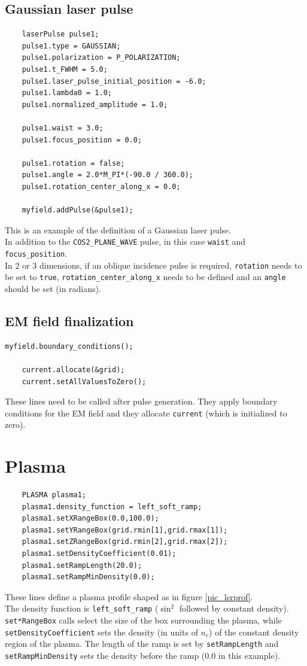 \documentclass[11pt,a4paper]{report}
\begin{document}
\subsection{Gaussian laser pulse}
\begin{lstlisting}
	laserPulse pulse1;
	pulse1.type = GAUSSIAN;
	pulse1.polarization = P_POLARIZATION;
	pulse1.t_FWHM = 5.0;
	pulse1.laser_pulse_initial_position = -6.0;
	pulse1.lambda0 = 1.0;
	pulse1.normalized_amplitude = 1.0;
    
	pulse1.waist = 3.0;
	pulse1.focus_position = 0.0;
    
	pulse1.rotation = false;
	pulse1.angle = 2.0*M_PI*(-90.0 / 360.0);
	pulse1.rotation_center_along_x = 0.0;

	myfield.addPulse(&pulse1);
\end{lstlisting}
This is an example of the definition of a Gaussian laser pulse.\\
In addition to the \verb+COS2_PLANE_WAVE+ pulse, in this case \verb+waist+ and \verb+focus_position+.\\
In 2 or 3 dimensions, if an oblique incidence pulse is required, \verb+rotation+ needs to be set to \verb+true+,   \verb+rotation_center_along_x+ needs to be defined and an \verb+angle+ should be set (in radians).
\subsection{EM field finalization}
\begin{lstlisting}[backgroundcolor=\color{no_modify}]
	myfield.boundary_conditions();

	current.allocate(&grid);
	current.setAllValuesToZero();
\end{lstlisting}
These lines need to be called after pulse generation. They apply boundary conditions for the EM field and they allocate \verb+current+ (which is initialized to zero).
\section{Plasma}
\begin{lstlisting}
	PLASMA plasma1;
	plasma1.density_function = left_soft_ramp;      
	plasma1.setXRangeBox(0.0,100.0);    
	plasma1.setYRangeBox(grid.rmin[1],grid.rmax[1]);                 
	plasma1.setZRangeBox(grid.rmin[2],grid.rmax[2]);
	plasma1.setDensityCoefficient(0.01);
	plasma1.setRampLength(20.0);
	plasma1.setRampMinDensity(0.0);             
\end{lstlisting}
These lines define a plasma profile shaped as in figure \ref{pic_lsrprof}.\\
The density function is \verb+left_soft_ramp+ ($\sin^2$ followed by constant density). \verb+set*RangeBox+ calls select the size of the box surrounding the plasma, while \verb+setDensityCoefficient+ sets the density (in units of $n_c$) of the constant density region of the plasma. The length of the ramp is set by \verb+setRampLength+ and \verb+setRampMinDensity+ sets the density before the ramp (0.0 in this example).
\end{document}
